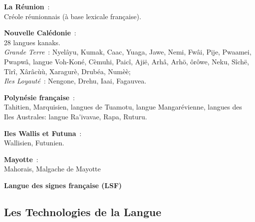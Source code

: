 \begin{french}
\begin{multicols}{2}
{\bf La Réunion}~:\\
Créole réunionnais (à base lexicale française).

{\bf Nouvelle Calédonie}~:\\
28 langues kanaks.\\
{\it Grande Terre}~: Nyelâyu, Kumak, Caac, Yuaga, Jawe, Nemi, Fwâi, Pije, Pwaamei, Pwapwâ, langue Voh-Koné, Cèmuhi, Paicî, Ajië, Arhâ, Arhö, ôrôwe, Neku, Sîchë, Tîrî, Xârâcùù, Xaragurè, Drubéa, Numèè; \\
{\it Iles Loyauté}~: Nengone, Drehu, Iaai, Fagauvea.

{\bf Polynésie française}~:\\
Tahitien, Marquisien, langues de Tuamotu, langue Mangarévienne, langues des Iles Australes: langue Ra{\mbox '}ivavae, Rapa, Ruturu.

{\bf Iles Wallis et Futuna}~:\\
Wallisien, Futunien.

{\bf Mayotte}~:\\
Mahorais, Malgache de Mayotte

{\bf Langue des signes française (LSF)}\\

\end{multicols}

\clearpage


\begin{multicols}{2}

\subsection{Les Technologies de la Langue}


\end{multicols}
\end{french}
